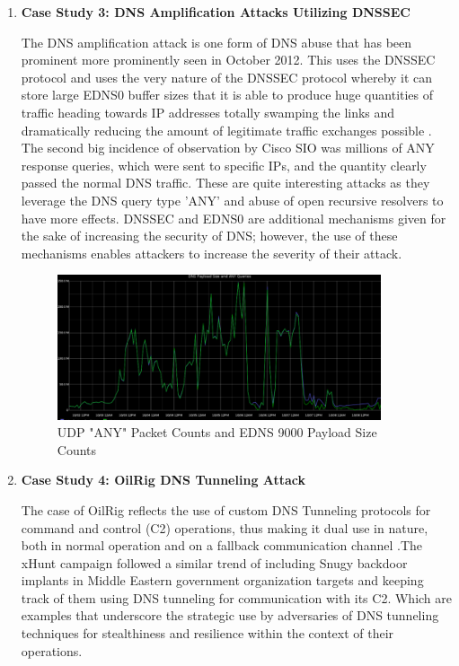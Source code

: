 \begin{enumerate}
\vspace{200pt}


\item\textbf{ Case Study 3: DNS Amplification Attacks Utilizing DNSSEC }

The DNS amplification attack is one form of DNS abuse that has been prominent more prominently seen in October 2012. This uses the DNSSEC protocol and uses the very nature of the DNSSEC protocol whereby it can store large EDNS0 buffer sizes that it is able to produce huge quantities of traffic heading towards IP addresses totally swamping the links and dramatically reducing the amount of legitimate traffic exchanges possible \cite{ Middleton2024}.  The second big incidence of observation by Cisco SIO was millions of ANY response queries, which were sent to specific IPs, and the quantity clearly passed the normal DNS traffic. These are quite interesting attacks as they leverage the DNS query type 'ANY' and abuse of open recursive resolvers to have more effects. DNSSEC and EDNS0 are additional mechanisms given for the sake of increasing the security of DNS; however, the use of these mechanisms enables attackers to increase the severity of their attack.

\captionsetup{font= footnotesize}
\begin{figure}[ht!]
    \centering
    \includegraphics[width=0.9\textwidth]{background/UDP.png}
    \caption{UDP "ANY" Packet Counts and EDNS 9000 Payload Size Counts}
    \label{fig:figNine}
\end{figure}

\item\textbf{ Case Study 4: OilRig DNS Tunneling Attack }

The case of OilRig reflects the use of custom DNS Tunneling protocols for command and control (C2) operations, thus making it dual use in nature, both in normal operation and on a fallback communication channel \cite{paloaltonetworks2021dnsattacks}.The xHunt campaign followed a similar trend of including Snugy backdoor implants in Middle Eastern government organization targets and keeping track of them using DNS tunneling for communication with its C2.  Which are examples that underscore the strategic use by adversaries of DNS tunneling techniques for stealthiness and resilience within the context of their operations. 


\end{enumerate}
